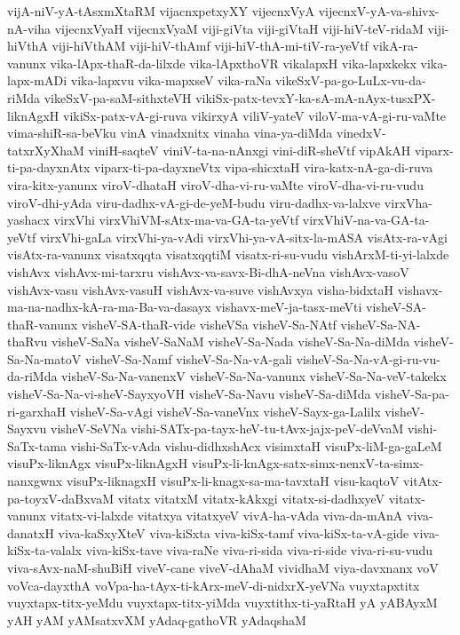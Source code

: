 {vijA-niV-yA-tAsxmXtaRM
vijacnxpetxyXY
vijecnxVyA
vijecnxV-yA-va-shivx-nA-viha
vijecnxVyaH
vijecnxVyaM
viji-giVta
viji-giVtaH
viji-hiV-teV-ridaM
viji-hiVthA
viji-hiVthAM
viji-hiV-thAmf
viji-hiV-thA-mi-tiV-ra-yeVtf
vikA-ra-vanunx
vika-lApx-thaR-da-lilxde
vika-lApxthoVR
vikalapxH
vika-lapxkekx
vika-lapx-mADi
vika-lapxvu
vika-mapxseV
vika-raNa
vikeSxV-pa-go-LuLx-vu-da-riMda
vikeSxV-pa-saM-sithxteVH
vikiSx-patx-tevxY-ka-sA-mA-nAyx-tusxPX-liknAgxH
vikiSx-patx-vA-gi-ruva
vikirxyA
viliV-yateV
viloV-ma-vA-gi-ru-vaMte
vima-shiR-sa-beVku
vinA
vinadxnitx
vinaha
vina-ya-diMda
vinedxV-tatxrXyXhaM
viniH-saqteV
viniV-ta-na-nAnxgi
vini-diR-sheVtf
vipAkAH
viparx-ti-pa-dayxnAtx
viparx-ti-pa-dayxneVtx
vipa-shicxtaH
vira-katx-nA-ga-di-ruva
vira-kitx-yanunx
viroV-dhataH
viroV-dha-vi-ru-vaMte
viroV-dha-vi-ru-vudu
viroV-dhi-yAda
viru-dadhx-vA-gi-de-yeM-budu
viru-dadhx-va-lalxve
virxVha-yashacx
virxVhi
virxVhiVM-sAtx-ma-va-GA-ta-yeVtf
virxVhiV-na-va-GA-ta-yeVtf
virxVhi-gaLa
virxVhi-ya-vAdi
virxVhi-ya-vA-sitx-la-mASA
visAtx-ra-vAgi
visAtx-ra-vanunx
visatxqqta
visatxqqtiM
visatx-ri-su-vudu
vishArxM-ti-yi-lalxde
vishAvx
vishAvx-mi-tarxru
vishAvx-va-savx-Bi-dhA-neVna
vishAvx-vasoV
vishAvx-vasu
vishAvx-vasuH
vishAvx-va-suve
vishAvxya
visha-bidxtaH
vishavx-ma-na-nadhx-kA-ra-ma-Ba-va-dasayx
vishavx-meV-ja-tasx-meVti
visheV-SA-thaR-vanunx
visheV-SA-thaR-vide
visheVSa
visheV-Sa-NAtf
visheV-Sa-NA-thaRvu
visheV-SaNa
visheV-SaNaM
visheV-Sa-Nada
visheV-Sa-Na-diMda
visheV-Sa-Na-matoV
visheV-Sa-Namf
visheV-Sa-Na-vA-gali
visheV-Sa-Na-vA-gi-ru-vu-da-riMda
visheV-Sa-Na-vanenxV
visheV-Sa-Na-vanunx
visheV-Sa-Na-veV-takekx
visheV-Sa-Na-vi-sheV-SayxyoVH
visheV-Sa-Navu
visheV-Sa-diMda
visheV-Sa-pa-ri-garxhaH
visheV-Sa-vAgi
visheV-Sa-vaneVnx
visheV-Sayx-ga-Lalilx
visheV-Sayxvu
visheV-SeVNa
vishi-SATx-pa-tayx-heV-tu-tAvx-jajx-peV-deVvaM
vishi-SaTx-tama
vishi-SaTx-vAda
vishu-didhxshAcx
visimxtaH
visuPx-liM-ga-gaLeM
visuPx-liknAgx
visuPx-liknAgxH
visuPx-li-knAgx-satx-simx-nenxV-ta-simx-nanxgwnx
visuPx-liknagxH
visuPx-li-knagx-sa-ma-tavxtaH
visu-kaqtoV
vitAtx-pa-toyxV-daBxvaM
vitatx
vitatxM
vitatx-kAkxgi
vitatx-si-dadhxyeV
vitatx-vanunx
vitatx-vi-lalxde
vitatxya
vitatxyeV
vivA-ha-vAda
viva-da-mAnA
viva-danatxH
viva-kaSxyXteV
viva-kiSxta
viva-kiSx-tamf
viva-kiSx-ta-vA-gide
viva-kiSx-ta-valalx
viva-kiSx-tave
viva-raNe
viva-ri-sida
viva-ri-side
viva-ri-su-vudu
viva-sAvx-naM-shuBiH
viveV-cane
viveV-dAhaM
vividhaM
viya-davxnanx
voV
voVca-dayxthA
voVpa-ha-tAyx-ti-kArx-meV-di-nidxrX-yeVNa
vuyxtapxtitx
vuyxtapx-titx-yeMdu
vuyxtapx-titx-yiMda
vuyxtithx-ti-yaRtaH
yA
yABAyxM
yAH
yAM
yAMsatxvXM
yAdaq-gathoVR
yAdaqshaM
}
